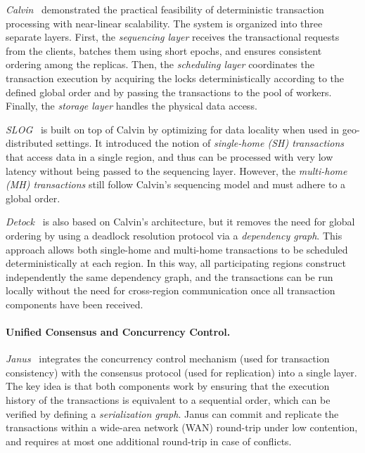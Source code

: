\textit{Calvin}~\cite{thomson2012calvin} demonstrated the practical feasibility of deterministic transaction processing with near-linear scalability. The system is organized into three separate layers. First, the \textit{sequencing layer} receives the transactional requests from the clients, batches them using short epochs, and ensures consistent ordering among the replicas. Then, the \textit{scheduling layer} coordinates the transaction execution by acquiring the locks deterministically according to the defined global order and by passing the transactions to the pool of workers. Finally, the \textit{storage layer} handles the physical data access.

\textit{SLOG}~\cite{ren2019slog} is built on top of Calvin by optimizing for data locality when used in geo-distributed settings. It introduced the notion of \textit{single-home (SH) transactions} that access data in a single region, and thus can be processed with very low latency without being passed to the sequencing layer. However, the \textit{multi-home (MH) transactions} still follow Calvin's sequencing model and must adhere to a global order.

\textit{Detock}~\cite{nguyen2023detock} is also based on Calvin's architecture, but it removes the need for global ordering by using a deadlock resolution protocol via a \textit{dependency graph}. This approach allows both single-home and multi-home transactions to be scheduled deterministically at each region. In this way, all participating regions construct independently the same dependency graph, and the transactions can be run locally without the need for cross-region communication once all transaction components have been received.

\paragraph{Unified Consensus and Concurrency Control.}
\textit{Janus}~\cite{mu2016consolidating} integrates the concurrency control mechanism (used for transaction consistency) with the consensus protocol (used for replication) into a single layer. The key idea is that both components work by ensuring that the execution history of the transactions is equivalent to a sequential order, which can be verified by defining a \textit{serialization graph}. Janus can commit and replicate the transactions within a wide-area network (WAN) round-trip under low contention, and requires at most one additional round-trip in case of conflicts.


